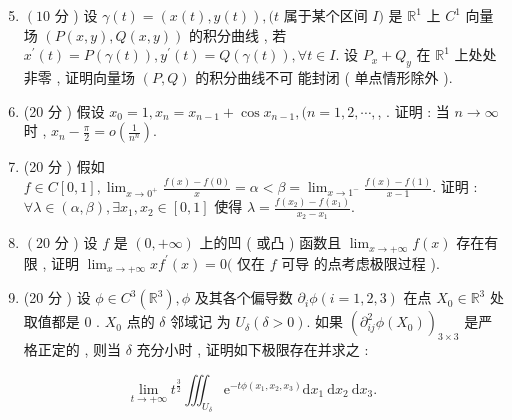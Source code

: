\documentclass[10pt]{article}
\begin{document}
\begin{enumerate}
  \setcounter{enumi}{4}
  \item $\left(10\right.$  分 )  设  $\gamma(t)=(x(t), y(t)),(t$  属于某个区间  $I)$  是  $\mathbb{R}^{1}$  上  $C^{1}$  向量场  $(P(x, y), Q(x, y))$  的积分曲线 ,  若  $x^{\prime}(t)=P(\gamma(t)), y^{\prime}(t)=Q(\gamma(t)), \forall t \in I$.  设  $P_{x}+Q_{y}$  在  $\mathbb{R}^{1}$  上处处非零 ,  证明向量场  $(P, Q)$  的积分曲线不可   能封闭  ( 单点情形除外 ).

  \item (20  分 )  假设  $x_{0}=1, x_{n}=x_{n-1}+\cos x_{n-1},(n=1,2, \cdots,$, .  证明 :  当  $n \rightarrow \infty$  时 , $x_{n}-\frac{\pi}{2}=o\left(\frac{1}{n^{n}}\right)$.

  \item (20  分 )  假如  $f \in C[0,1], \lim _{x \rightarrow 0^{+}} \frac{f(x)-f(0)}{x}=\alpha<\beta=\lim _{x \rightarrow 1^{-}} \frac{f(x)-f(1)}{x-1}$.  证明 : $\forall \lambda \in(\alpha, \beta), \exists x_{1}, x_{2} \in[0,1]$  使得  $\lambda=\frac{f\left(x_{2}\right)-f\left(x_{1}\right)}{x_{2}-x_{1}}$.

  \item $\left(20\right.$  分 )  设  $f$  是  $(0,+\infty)$  上的凹  ( 或凸 )  函数且  $\lim _{x \rightarrow+\infty} f(x)$  存在有限 ,  证明  $\lim _{x \rightarrow+\infty} x f^{\prime}(x)=0($  仅在  $f$  可导   的点考虑极限过程 ).

  \item (20  分 )  设  $\phi \in C^{3}\left(\mathbb{R}^{3}\right), \phi$  及其各个偏导数  $\partial_{i} \phi(i=1,2,3)$  在点  $X_{0} \in \mathbb{R}^{3}$  处取值都是  0 . $X_{0}$  点的  $\delta$  邻域记   为  $U_{\delta}(\delta>0)$.  如果  $\left(\partial_{i j}^{2} \phi\left(X_{0}\right)\right)_{3 \times 3}$  是严格正定的 ,  则当  $\delta$  充分小时 ,  证明如下极限存在并求之 :

\end{enumerate}
$$
\lim _{t \rightarrow+\infty} t^{\frac{3}{2}} \iiint_{U_{\delta}} \mathrm{e}^{-t \phi\left(x_{1}, x_{2}, x_{3}\right)} \mathrm{d} x_{1} \mathrm{~d} x_{2} \mathrm{~d} x_{3} .
$$
\end{document}
